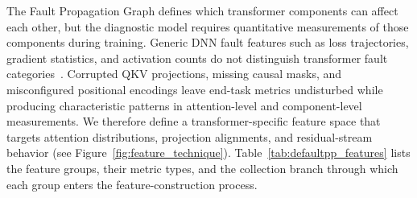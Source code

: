 The Fault Propagation Graph defines which transformer components can affect each other, but the diagnostic model requires quantitative measurements of those components during training. Generic DNN fault features such as loss trajectories, gradient statistics, and activation counts do not distinguish transformer fault categories~\cite{frankenformer}. Corrupted QKV projections, missing causal masks, and misconfigured positional encodings leave end-task metrics undisturbed while producing characteristic patterns in attention-level and component-level measurements. We therefore define a transformer-specific feature space that targets attention distributions, projection alignments, and residual-stream behavior (see Figure~\ref{fig:feature_technique}). Table~\ref{tab:defaultpp_features} lists the feature groups, their metric types, and the collection branch through which each group enters the feature-construction process.


